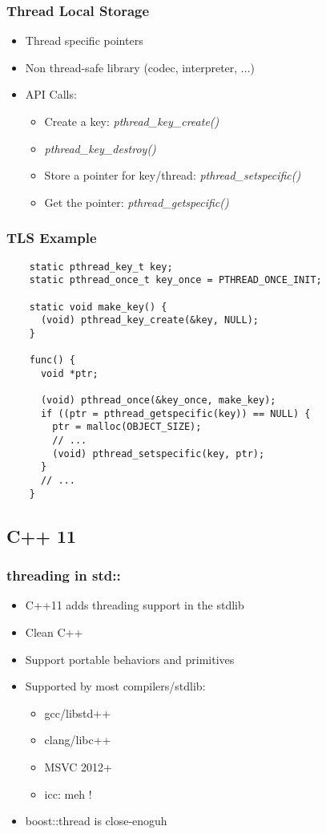 \begin{frame}
  \frametitle{Thread Local Storage}

  \begin{itemize}
  \item Thread specific pointers
  \item Non thread-safe library (codec, interpreter, ...)
  \item API Calls:
    \begin{itemize}
    \item Create a key: \emph{pthread\_key\_create()}
    \item \emph{pthread\_key\_destroy()}
    \item Store a pointer for key/thread: \emph{pthread\_setspecific()}
    \item Get the pointer: \emph{pthread\_getspecific()}
    \end{itemize}
  \end{itemize}
\end{frame}

\begin{frame}[fragile]
  \frametitle{TLS Example}

  \begin{verbatim}
    static pthread_key_t key;
    static pthread_once_t key_once = PTHREAD_ONCE_INIT;

    static void make_key() {
      (void) pthread_key_create(&key, NULL);
    }

    func() {
      void *ptr;

      (void) pthread_once(&key_once, make_key);
      if ((ptr = pthread_getspecific(key)) == NULL) {
        ptr = malloc(OBJECT_SIZE);
        // ...
        (void) pthread_setspecific(key, ptr);
      }
      // ...
    }
  \end{verbatim}
\end{frame}




\subsection{C++ 11}
\label{subsec:cpp11}

\begin{frame}
  \frametitle{threading in std::}

  \begin{itemize}
  \item C++11 adds threading support in the stdlib
  \item Clean C++
  \item Support portable behaviors and primitives
  \item Supported by most compilers/stdlib:
    \begin{itemize}
    \item gcc/libstd++
    \item clang/libc++
    \item MSVC 2012+
    \item icc: meh !
    \end{itemize}
  \item boost::thread is close-enoguh
  \end{itemize}
\end{frame}


